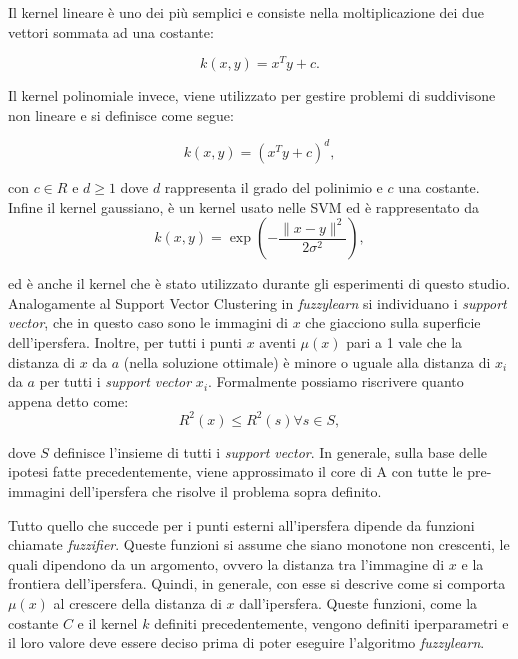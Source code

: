 \documentclass[12pt,italian]{report}
\begin{document}
Il kernel lineare è uno dei più semplici e consiste nella moltiplicazione dei due vettori sommata ad una costante:
	
	\[ k(x, y) = x^T y + c.\]

Il kernel polinomiale invece, viene utilizzato per gestire problemi di suddivisone non lineare e si definisce come segue:
	
	\[ k(x, y) = (x^T y + c)^d,\]

con $c \in R$ e $d \geq 1$ dove $d$ rappresenta il grado del polinimio e $c$ una costante. Infine il kernel gaussiano, è un kernel usato nelle SVM ed è rappresentato da
	\[k(x, y) = \exp \left (- \frac{\lVert x - y \rVert^2}{2\sigma^2} \right ), \]

ed è anche il kernel che è stato utilizzato durante gli esperimenti di questo studio. 
Analogamente al Support Vector Clustering \cite{ben_hur} in \emph{fuzzylearn} si individuano i \emph{support vector}, che in questo caso sono le immagini di $x $ che giacciono sulla superficie dell'ipersfera. Inoltre, per tutti i punti $x$ aventi $ \mu(x) $ pari a 1 vale che la distanza di $x$ da $a$ (nella soluzione ottimale) è minore o uguale alla distanza di $x_{i}$ da $a$ per tutti i \emph{support vector} $x_{i}$.
Formalmente possiamo riscrivere quanto appena detto come:
\[R^2(x) \leq R^2(s) \forall s \in S,\]

dove $S$ definisce l'insieme di tutti i \emph{support vector}. In generale, sulla base delle ipotesi fatte precedentemente, viene approssimato il core di A con tutte le pre-immagini dell'ipersfera che risolve il problema sopra definito. 

Tutto quello che succede per i punti esterni all'ipersfera dipende da funzioni chiamate \emph{fuzzifier}. Queste funzioni si assume che siano monotone non crescenti, le quali dipendono da un argomento, ovvero la distanza tra l'immagine di $x$ e la frontiera dell'ipersfera. Quindi, in generale, con esse si descrive come si comporta $ \mu(x) $ al crescere della distanza di $x$ dall'ipersfera. Queste funzioni, come la costante $C$ e il kernel $k$ definiti precedentemente, vengono definiti iperparametri e il loro valore deve essere deciso prima di poter eseguire l'algoritmo \emph{fuzzylearn}. 
\end{document}
